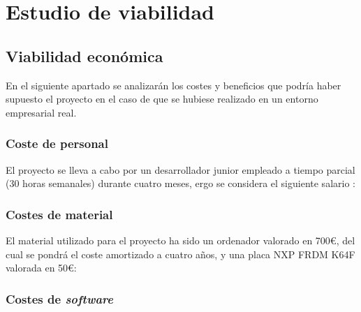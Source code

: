 \section{Estudio de viabilidad}

\subsection{Viabilidad económica}

En el siguiente apartado se analizarán los costes y beneficios que podría haber supuesto el proyecto en el caso de que se hubiese realizado en un entorno empresarial real.

\subsubsection{Coste de personal}

El proyecto se lleva a cabo por un desarrollador junior empleado a tiempo parcial (30 horas semanales) durante cuatro meses, ergo se considera el siguiente salario \cite{web:irpf}:


\subsubsection{Costes de material}

El material utilizado para el proyecto ha sido un ordenador valorado en 700\euro, del cual se pondrá el coste amortizado a cuatro años, y una placa NXP FRDM K64F valorada en 50\euro:


\subsubsection{Costes de \textit{software}}


